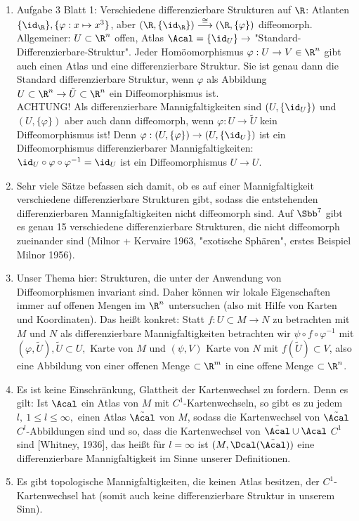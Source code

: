 \begin{rem}
	\begin{enumerate}[label = {\roman*})]
		\item Aufgabe 3 Blatt 1: Verschiedene differenzierbare Strukturen auf $\R$: Atlanten $ \{\id_\R\}, \{\varphi: x \mapsto x^3\} $, aber $ (\R,\{\id_\R\}) \overset{\cong}{\longrightarrow} (\R,\{\varphi\}) $ diffeomorph.\\
			Allgemeiner: $ U \subset \R^n $ offen, Atlas $ \Acal = \{\id_U\} \rightarrow $ "Standard-Differenzierbare-Struktur". Jeder Homöomorphismus $ \varphi:  U \to V \in \R^n $ gibt auch einen Atlas und eine differenzierbare Struktur. Sie ist genau dann die Standard differenzierbare Struktur, wenn $\varphi$ als Abbildung $ U \subset \R^n \to \tilde{U} \subset \R^n $ ein Diffeomorphismus ist.\\
			ACHTUNG! Als differenzierbare Mannigfaltigkeiten sind $ (U,\{\id_U\}) $ und $(U,\{\varphi\})$ aber auch dann diffeomorph, wenn $\varphi: U \to \tilde{U}$ kein Diffeomorphismus ist! Denn $ \varphi: (U,\{\varphi\}) \to (U,\{\id_U\}) $ ist ein Diffeomorphismus differenzierbarer Mannigfaltigkeiten: $ \id_U \circ \varphi \circ \varphi^{-1} = \id_U $ ist ein Diffeomorphismus $ U \to U $.
		\item Sehr viele Sätze befassen sich damit, ob es auf einer Mannigfaltigkeit verschiedene differenzierbare Strukturen gibt, sodass die entstehenden differenzierbaren Mannigfaltigkeiten nicht diffeomorph sind. Auf $ \Sbb^7 $ gibt es genau 15 verschiedene differenzierbare Strukturen, die nicht diffeomorph zueinander sind (Milnor + Kervaire 1963, "exotische Sphären", erstes Beispiel Milnor 1956).
		\item Unser Thema hier: Strukturen, die unter der Anwendung von Diffeomorphismen invariant sind. Daher können wir lokale Eigenschaften immer auf offenen Mengen im $\R^n$ untersuchen (also mit Hilfe von Karten und Koordinaten). Das heißt konkret: Statt $ f : U \subset M \to N $ zu betrachten mit $M$ und $N$ als differenzierbare Mannigfaltigkeiten betrachten wir $ \psi \circ f \circ \varphi^{-1} $ mit $ (\varphi,\tilde{U}), \tilde{U} \subset U, $ Karte von $M$ und $ (\psi,V) $ Karte von $N$ mit $ f(\tilde{U})\subset V $, also eine Abbildung von einer offenen Menge $\subset \R^m$ in eine offene Menge $\subset \R^n$.
		\item Es ist keine Einschränkung, Glattheit der Kartenwechsel zu fordern. Denn es gilt: Ist $\Acal$ ein Atlas von $M$ mit $C^1$-Kartenwechseln, so gibt es zu jedem $l,\ 1 \leq l \leq \infty,$ einen Atlas $ \tilde{\Acal} $ von $M$, sodass die Kartenwechsel von $\tilde{\Acal}$ $C^l$-Abbildungen sind und so, dass die Kartenwechsel von $\tilde{\Acal} \cup \Acal$ $C^1$ sind [Whitney, 1936], das heißt für $l = \infty$ ist $ (M,\Dcal(\tilde{\Acal})) $ eine differenzierbare Mannigfaltigkeit im Sinne unserer Definitionen.
		\item Es gibt topologische Mannigfaltigkeiten, die keinen Atlas besitzen, der $C^1$-Kartenwechsel hat (somit auch keine differenzierbare Struktur in unserem Sinn).
	\end{enumerate}
\end{rem}


